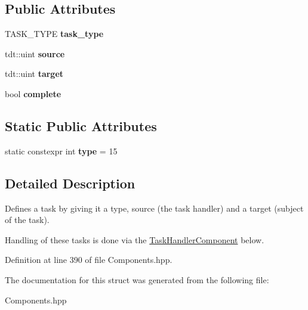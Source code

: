 \subsection*{Public Attributes}
\begin{DoxyCompactItemize}
\item 
T\+A\+S\+K\+\_\+\+T\+Y\+PE {\bfseries task\+\_\+type}\hypertarget{struct_task_component_a8cac16b519aaa5976c3067ad8c82dd4a}{}\label{struct_task_component_a8cac16b519aaa5976c3067ad8c82dd4a}

\item 
tdt\+::uint {\bfseries source}\hypertarget{struct_task_component_a37a5e40f9725acdb7c1ec02a1dc2e4db}{}\label{struct_task_component_a37a5e40f9725acdb7c1ec02a1dc2e4db}

\item 
tdt\+::uint {\bfseries target}\hypertarget{struct_task_component_a4d10619d204daefabb89d566cb3b99fc}{}\label{struct_task_component_a4d10619d204daefabb89d566cb3b99fc}

\item 
bool {\bfseries complete}\hypertarget{struct_task_component_a0ebf4b1137c1ef072369289f1c8580fe}{}\label{struct_task_component_a0ebf4b1137c1ef072369289f1c8580fe}

\end{DoxyCompactItemize}
\subsection*{Static Public Attributes}
\begin{DoxyCompactItemize}
\item 
static constexpr int {\bfseries type} = 15\hypertarget{struct_task_component_a931d8eea55f368a3eadbeb988dcaa7ec}{}\label{struct_task_component_a931d8eea55f368a3eadbeb988dcaa7ec}

\end{DoxyCompactItemize}


\subsection{Detailed Description}
Defines a task by giving it a type, source (the task handler) and a target (subject of the task). 

Handling of these tasks is done via the \hyperlink{struct_task_handler_component}{Task\+Handler\+Component} below. 

Definition at line 390 of file Components.\+hpp.



The documentation for this struct was generated from the following file\+:\begin{DoxyCompactItemize}
\item 
Components.\+hpp\end{DoxyCompactItemize}
